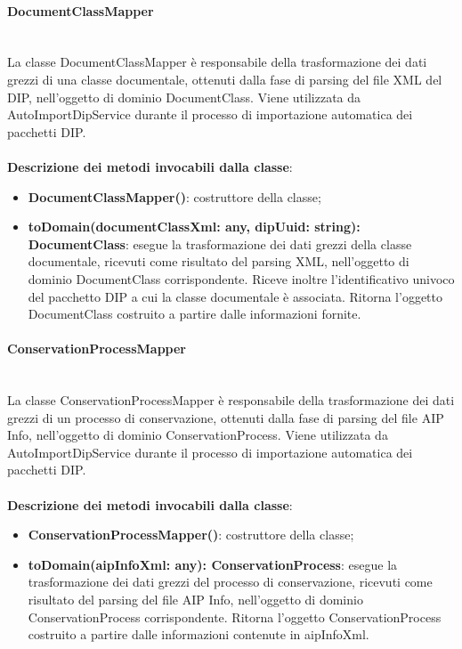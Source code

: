 \documentclass[a4paper,12pt]{article}
\begin{document}
{{{                \paragraph{DocumentClassMapper}\label{par:DocumentClassMapper}\mbox{}\\
                La classe DocumentClassMapper è responsabile della trasformazione dei dati grezzi di una classe documentale, ottenuti dalla fase di parsing del file XML del DIP, nell'oggetto di dominio DocumentClass. Viene utilizzata da AutoImportDipService durante il processo di importazione automatica dei pacchetti DIP.\\
                \\
                \noindent \textbf{Descrizione dei metodi invocabili dalla classe}:
                \begin{itemize}
                    \item \textbf{DocumentClassMapper()}: costruttore della classe;
                    \item \textbf{toDomain(documentClassXml: any, dipUuid: string): DocumentClass}: esegue la trasformazione dei dati grezzi della classe documentale, ricevuti come risultato del parsing XML, nell'oggetto di dominio DocumentClass corrispondente. Riceve inoltre l'identificativo univoco del pacchetto DIP a cui la classe documentale è associata. Ritorna l'oggetto DocumentClass costruito a partire dalle informazioni fornite.
                \end{itemize}
                \paragraph{ConservationProcessMapper}\label{par:ConservationProcessMapper}\mbox{}\\
                La classe ConservationProcessMapper è responsabile della trasformazione dei dati grezzi di un processo di conservazione, ottenuti dalla fase di parsing del file AIP Info, nell'oggetto di dominio ConservationProcess. Viene utilizzata da AutoImportDipService durante il processo di importazione automatica dei pacchetti DIP.\\
                \\
                \noindent \textbf{Descrizione dei metodi invocabili dalla classe}:
                \begin{itemize}
                    \item \textbf{ConservationProcessMapper()}: costruttore della classe;
                    \item \textbf{toDomain(aipInfoXml: any): ConservationProcess}: esegue la trasformazione dei dati grezzi del processo di conservazione, ricevuti come risultato del parsing del file AIP Info, nell'oggetto di dominio ConservationProcess corrispondente. Ritorna l'oggetto ConservationProcess costruito a partire dalle informazioni contenute in aipInfoXml.
                \end{itemize}
}}}
\end{document}

